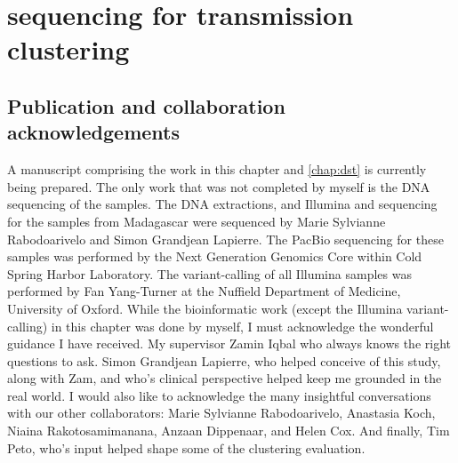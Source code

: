 
\chapter{\ont{} sequencing for \mtb{} transmission clustering}
\label{chap:clustering}

\ifpdf
    \graphicspath{{Chapter2/Figs/Raster/}{Chapter2/Figs/PDF/}{Chapter2/Figs/}}
\else
    \graphicspath{{Chapter2/Figs/Vector/}{Chapter2/Figs/}}
\fi


\setcounter{section}{-1}
\section{Publication and collaboration acknowledgements}
\label{sec:ch2-acknowledge}

A manuscript comprising the work in this chapter and \autoref{chap:dst} is currently being prepared. The only work that was not completed by myself is the DNA sequencing of the samples.
The DNA extractions, and Illumina and \ont{} sequencing for the samples from Madagascar were sequenced by Marie Sylvianne Rabodoarivelo and Simon Grandjean Lapierre. The PacBio sequencing for these samples was performed by the Next Generation Genomics Core within Cold Spring Harbor Laboratory.
The variant-calling of all Illumina samples was performed by Fan Yang-Turner at the Nuffield Department of Medicine, University of Oxford. 
While the bioinformatic work (except the Illumina variant-calling) in this chapter was done by myself, I must acknowledge the wonderful guidance I have received. My supervisor Zamin Iqbal who always knows the right questions to ask. Simon Grandjean Lapierre, who helped conceive of this study, along with Zam, and who's clinical perspective helped keep me grounded in the real world. I would also like to acknowledge the many insightful conversations with our other collaborators: Marie Sylvianne Rabodoarivelo, Anastasia Koch, Niaina Rakotosamimanana, Anzaan Dippenaar, and Helen Cox. And finally, Tim Peto, who's input helped shape some of the clustering evaluation.

